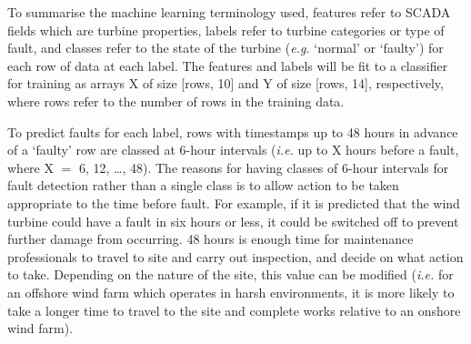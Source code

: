 To summarise the machine learning terminology used, features refer to SCADA
fields which are turbine properties, labels refer to turbine categories or
type of fault, and classes refer to the state of the turbine (\textit{e.g.} `normal' or
`faulty') for each row of data at each label. The features and labels will be
fit to a classifier for training as arrays X of size [rows, 10] and Y of size
[rows, 14], respectively, where rows refer to the number of rows in the
training data.

To predict faults for each label, rows with timestamps up to 48 hours in
advance of a `faulty' row are classed at 6-hour intervals (\textit{i.e.} up to X hours
before a fault, where X \ensuremath{=} 6, 12, \dots, 48). The reasons for having classes
of 6-hour intervals for fault detection rather than a single class is to allow
action to be taken appropriate to the time before fault. For example, if it is
predicted that the wind turbine could have a fault in six hours or less, it
could be switched off to prevent further damage from occurring. 48 hours is
enough time for maintenance professionals to travel to site and carry out
inspection, and decide on what action to take. Depending on the nature of the
site, this value can be modified (\textit{i.e.} for an offshore wind farm which
operates in harsh environments, it is more likely to take a longer time to
travel to the site and complete works relative to an onshore wind farm).

